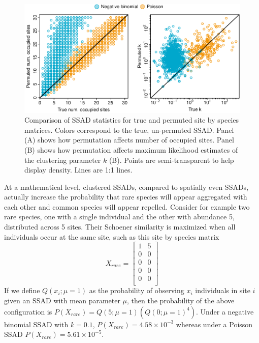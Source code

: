 \documentclass[]{article}
\begin{document}
\begin{figure}

{\centering \includegraphics{RarePlusComMinus_files/figure-latex/ssadPerm_plot-1} 

}

\caption{Comparison of SSAD statistics for true and permuted site by species matrices. Colors correspond to the true, un-permuted SSAD. Panel (A) shows how permutation affects number of occupied sites. Panel (B) shows how permutation affects maximum likelihood estimates of the clustering parameter $k$ (B). Points are semi-transparent to help display density. Lines are 1:1 lines. \label{fig:ssadPerm}}\label{fig:ssadPerm_plot}
\end{figure}

At a mathematical level, clustered SSADs, compared to spatially even
SSADs, actually increase the probability that rare species will appear
aggregated with each other and common species will appear repelled.
Consider for example two rare species, one with a single individual and
the other with abundance 5, distributed across 5 sites. Their Schoener
similarity is maximized when all individuals occur at the same site,
such as this site by species matrix \[
X_{rare} = \begin{bmatrix} 1 & 5 \\ 0 & 0 \\ 0 & 0 \\ 0 & 0 \\ 0 & 0 \\ \end{bmatrix}
\] If we define \(Q(x_i; \mu = 1)\) as the probability of observing
\(x_i\) individuals in site \(i\) given an SSAD with mean parameter
\(\mu\), then the probability of the above configuration is
\(P(X_{rare}) = Q(5; \mu = 1) \left(Q(0; \mu = 1)^{4}\right)\). Under a
negative binomial SSAD with \(k = 0.1\),
\(P(X_{rare}) = 4.58 \times 10^{-3}\) whereas under a Poisson SSAD
\(P(X_{rare}) = 5.61 \times 10^{-5}\).
\end{document}
